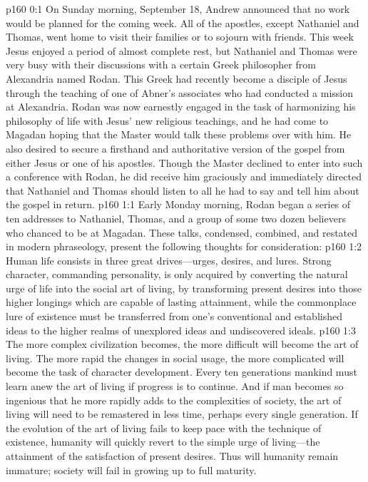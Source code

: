 \author{Midwayer Commission}
\vs p160 0:1 On Sunday morning, September 18, Andrew announced that no work would be planned for the coming week. All of the apostles, except Nathaniel and Thomas, went home to visit their families or to sojourn with friends. This week Jesus enjoyed a period of almost complete rest, but Nathaniel and Thomas were very busy with their discussions with a certain Greek philosopher from Alexandria named Rodan. This Greek had recently become a disciple of Jesus through the teaching of one of Abner’s associates who had conducted a mission at Alexandria. Rodan was now earnestly engaged in the task of harmonizing his philosophy of life with Jesus’ new religious teachings, and he had come to Magadan hoping that the Master would talk these problems over with him. He also desired to secure a firsthand and authoritative version of the gospel from either Jesus or one of his apostles. Though the Master declined to enter into such a conference with Rodan, he did receive him graciously and immediately directed that Nathaniel and Thomas should listen to all he had to say and tell him about the gospel in return.
%
\vs p160 1:1 Early Monday morning, Rodan began a series of ten addresses to Nathaniel, Thomas, and a group of some two dozen believers who chanced to be at Magadan. These talks, condensed, combined, and restated in modern phraseology, present the following thoughts for consideration:
\pc \vs p160 1:2 Human life consists in three great drives---urges, desires, and lures. Strong character, commanding personality, is only acquired by converting the natural urge of life into the social art of living, by transforming present desires into those higher longings which are capable of lasting attainment, while the commonplace lure of existence must be transferred from one’s conventional and established ideas to the higher realms of unexplored ideas and undiscovered ideals.
\vs p160 1:3 The more complex civilization becomes, the more difficult will become the art of living. The more rapid the changes in social usage, the more complicated will become the task of character development. Every ten generations mankind must learn anew the art of living if progress is to continue. And if man becomes so ingenious that he more rapidly adds to the complexities of society, the art of living will need to be remastered in less time, perhaps every single generation. If the evolution of the art of living fails to keep pace with the technique of existence, humanity will quickly revert to the simple urge of living---the attainment of the satisfaction of present desires. Thus will humanity remain immature; society will fail in growing up to full maturity.
